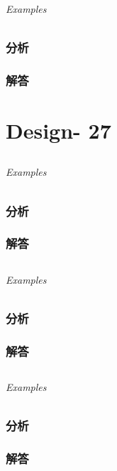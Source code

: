 \documentclass[UTF8,a4paper,12pt]{ctexbook}
\begin{document}
	\subparagraph{Examples}
	
	\subsection{分析}
	
	\subsection{解答}
\chapter{Design- 27}
\section{}
	
	\subparagraph{Examples}
	
	\subsection{分析}
	
	\subsection{解答}
	
\section{}
	
	\subparagraph{Examples}
	
	\subsection{分析}
	
	\subsection{解答}
	
\section{}
	
	\subparagraph{Examples}
	
	\subsection{分析}
	
	\subsection{解答}
	
\end{document}
